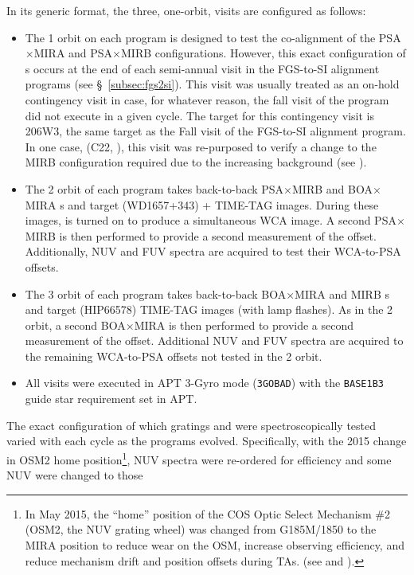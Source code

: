 In its generic format, the three, one-orbit, visits are configured as follows:
\begin{itemize}
	\item{The 1 orbit on each program is designed to test the co-alignment of the PSA$\times$MIRA and PSA$\times$MIRB  configurations.
However, this exact configuration of s occurs at the end of each semi-annual visit in the FGS-to-SI alignment programs (see \S~\ref{subsec:fgs2si}).
This visit was usually treated as an on-hold contingency visit in case, for whatever reason, the fall visit of the program did not execute in a given cycle.
The target for this contingency visit is 206W3, the same target as the Fall visit of the FGS-to-SI alignment program.
In one case, (C22, ), this visit was re-purposed to verify a change to the MIRB configuration required due to the increasing background (see ).}
	\item{The 2 orbit of each program takes back-to-back PSA$\times$MIRB and BOA$\times$MIRA s and target (WD1657+343) + TIME-TAG images. During these images,
	\plamptwo{} is turned on to produce a simultaneous WCA image.
	A second PSA$\times$MIRB  is then performed to provide a second measurement of the offset.
	Additionally, NUV and FUV spectra are acquired to test their WCA-to-PSA offsets.}
	\item{The 3 orbit of each program takes back-to-back BOA$\times$MIRA and MIRB s and target (HIP66578) TIME-TAG images (with lamp flashes).
	As in the 2 orbit, a second BOA$\times$MIRA  is then performed to provide a second measurement of the offset.
	Additional NUV and FUV spectra are acquired to the remaining WCA-to-PSA offsets not tested in the 2 orbit.}
	\item{All visits were executed in APT 3-Gyro mode (\texttt{3GOBAD}) with the \texttt{BASE1B3} guide star requirement set in APT.}
\end{itemize}
The exact configuration of which gratings and \cenwaves{} were spectroscopically tested varied with each cycle as the programs evolved.
Specifically, with the 2015 change in OSM2 home position\footnote{In May 2015, the ``home'' position of the COS Optic Select Mechanism \#2 (OSM2, the NUV grating wheel) was changed from G185M/1850 to the MIRA position to reduce wear on the OSM, increase observing efficiency, and reduce mechanism drift and position offsets during  TAs. (see  and ).}, NUV spectra were re-ordered for efficiency and some NUV \cenwaves{} were changed to those
